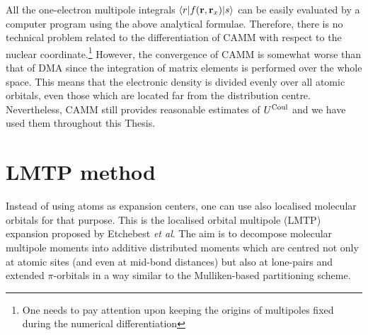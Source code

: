 \documentclass[a4paper,titlepage,twoside,fleqn,12pt]{book}
\begin{document}
\begin{appendices}
\begin{refsection}
All the one\hyp{}electron multipole integrals 
$\langle r \lvert f({\bf r},{\bf r}_x)\rvert s \rangle$ 
can be easily 
evaluated by a computer program using the above analytical formulae.
Therefore, there is no technical problem related to the differentiation of CAMM
with respect to the nuclear coordinate.\footnote{One needs to pay attention
upon keeping the origins of multipoles fixed during the numerical differentiation}
However, the convergence of CAMM
is somewhat worse than that of DMA since the integration of matrix elements 
is performed over the whole space. This means that the electronic density
is divided evenly over all atomic orbitals, even those which are located far
from the distribution centre. Nevertheless, CAMM still provides reasonable 
estimates of $U^{\rm Coul}$ and we have used them throughout this Thesis.

\section{LMTP method}

Instead of using atoms as expansion centers, one can use also localised molecular orbitals
for that purpose. This is the localised orbital multipole (LMTP) expansion 
proposed by Etchebest \emph{et al}. \citep{Etchebest.Lavery.Pullman.TheorChimActa.1982}
The aim is to decompose molecular multipole moments into additive
distributed moments which are centred not only at atomic sites
(and even at mid\hyp{}bond distances) but also at lone\hyp{}pairs 
and extended $\pi$\hyp{}orbitals in a way similar to the Mulliken\hyp{}based
partitioning scheme.


\end{refsection}
\end{appendices}
\end{document}
